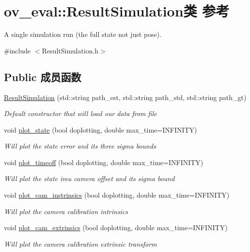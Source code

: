 \hypertarget{classov__eval_1_1ResultSimulation}{}\section{ov\+\_\+eval\+:\+:Result\+Simulation类 参考}
\label{classov__eval_1_1ResultSimulation}


A single simulation run (the full state not just pose).  




{\ttfamily \#include $<$Result\+Simulation.\+h$>$}

\subsection*{Public 成员函数}
\begin{DoxyCompactItemize}
\item 
\hyperlink{classov__eval_1_1ResultSimulation_ad75bc6dc74af33a2ecdf0c8eca44ecca}{Result\+Simulation} (std\+::string path\+\_\+est, std\+::string path\+\_\+std, std\+::string path\+\_\+gt)
\begin{DoxyCompactList}\small\item\em Default constructor that will load our data from file \end{DoxyCompactList}\item 
void \hyperlink{classov__eval_1_1ResultSimulation_aa7e8b0be0f423f9b77d29b0fb41cc715}{plot\+\_\+state} (bool doplotting, double max\+\_\+time=I\+N\+F\+I\+N\+I\+TY)
\begin{DoxyCompactList}\small\item\em Will plot the state error and its three sigma bounds \end{DoxyCompactList}\item 
void \hyperlink{classov__eval_1_1ResultSimulation_a3d927f6bd6eaf6eba2b5a067920ef662}{plot\+\_\+timeoff} (bool doplotting, double max\+\_\+time=I\+N\+F\+I\+N\+I\+TY)
\begin{DoxyCompactList}\small\item\em Will plot the state imu camera offset and its sigma bound \end{DoxyCompactList}\item 
void \hyperlink{classov__eval_1_1ResultSimulation_abb8a9eeb8c5e9b21c0558f27d4a9cf9a}{plot\+\_\+cam\+\_\+instrinsics} (bool doplotting, double max\+\_\+time=I\+N\+F\+I\+N\+I\+TY)
\begin{DoxyCompactList}\small\item\em Will plot the camera calibration intrinsics \end{DoxyCompactList}\item 
void \hyperlink{classov__eval_1_1ResultSimulation_a7f2f0d71c2b3d2f9db44ceb9542a8d9e}{plot\+\_\+cam\+\_\+extrinsics} (bool doplotting, double max\+\_\+time=I\+N\+F\+I\+N\+I\+TY)
\begin{DoxyCompactList}\small\item\em Will plot the camera calibration extrinsic transform \end{DoxyCompactList}\end{DoxyCompactItemize}
